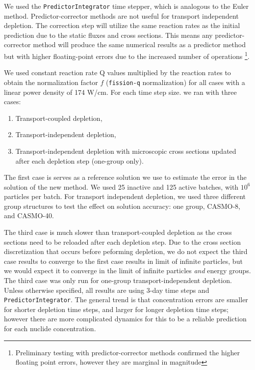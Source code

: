     We used the \verb.PredictorIntegrator. time stepper, which is analogous to
    the Euler method. Predictor-corrector methods are not useful for transport
    independent depletion. The correction step will utilize the same reaction
    rates as the initial prediction due to the static fluxes and cross sections.
    This means any predictor-corrector method will produce the same numerical
    results as a predictor method but with higher floating-point errors due to
    the increased number of operations \footnote{Preliminary testing with
    predictor-corrector methods confirmed the higher floating point errors,
    however they are marginal in magnitude}.

    We used constant reaction rate Q values multiplied by the reaction rates to
    obtain the normalization factor $f$ (\verb.fission-q. normalization) for all
    cases with a linear power density of 174 W/cm. For each time step size.
    we ran with three cases:
    \begin{enumerate}
        \item Transport-coupled depletion,
        \item Transport-independent depletion,
        \item Transport-independent depletion with microscopic cross sections
            updated after each depletion step (one-group only).
    \end{enumerate}

    The first case is serves as a reference solution we use to estimate the
    error in the solution of the new method. We used 25 inactive and 125 active
    batches, with $10^6$ particles per batch. For transport independent
    depletion, we used three different group structures to test the effect on
    solution accuracy: one group, CASMO-8, and CASMO-40.

    The third case is much slower than transport-coupled depletion as the cross
    sections need to be reloaded after each depletion step. Due to the cross
    section discretization that occurs before peforming depletion, we do not
    expect the third case results to converge to the first case results in limit
    of infinite particles, but we would expect it to converge in the limit of
    infinite particles {\it and} energy groups. The third case was only run for
    one-group transport-independent depletion.  Unless otherwise specified, all
    results are using 3-day time steps and \verb,PredictorIntegrator,. The
    general trend is that concentration errors are smaller for shorter depletion
    time steps, and larger for longer depletion time steps; however there are
    more complicated dynamics for this to be a reliable prediction for each
    nuclide concentration.

